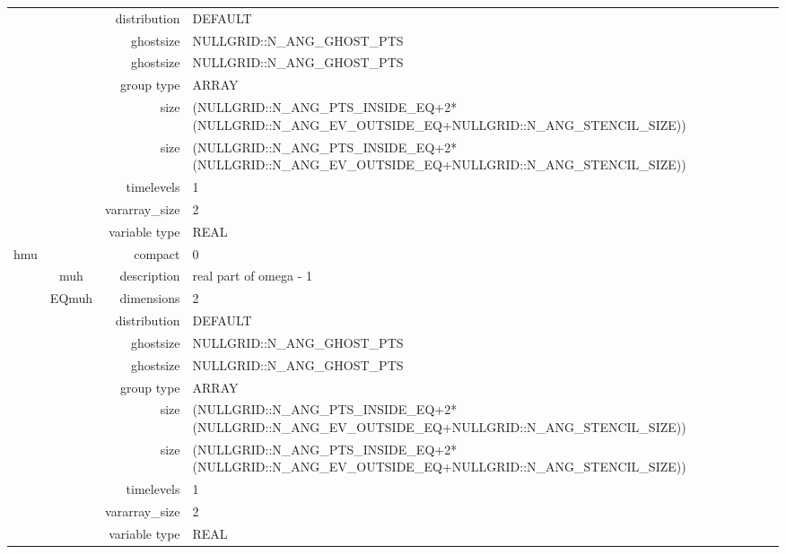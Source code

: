 \begin{tabular*}{150mm}{|c|c@{\extracolsep{\fill}}|rl|}
 &  & distribution & DEFAULT \\ 
 &  & ghostsize & NULLGRID::N\_ANG\_GHOST\_PTS \\ 
& ~ & ghostsize & NULLGRID::N\_ANG\_GHOST\_PTS \\ 
 &  & group type & ARRAY \\ 
 &  & size & (NULLGRID::N\_ANG\_PTS\_INSIDE\_EQ+2*(NULLGRID::N\_ANG\_EV\_OUTSIDE\_EQ+NULLGRID::N\_ANG\_STENCIL\_SIZE)) \\ 
& ~ & size & (NULLGRID::N\_ANG\_PTS\_INSIDE\_EQ+2*(NULLGRID::N\_ANG\_EV\_OUTSIDE\_EQ+NULLGRID::N\_ANG\_STENCIL\_SIZE)) \\ 
 &  & timelevels & 1 \\ 
 &  & vararray\_size & 2 \\ 
 &  & variable type & REAL \\ 
\hline 
hmu &  & compact & 0 \\ 
 & muh & description & real part of omega - 1 \\ 
 & EQmuh & dimensions & 2 \\ 
 &  & distribution & DEFAULT \\ 
 &  & ghostsize & NULLGRID::N\_ANG\_GHOST\_PTS \\ 
& ~ & ghostsize & NULLGRID::N\_ANG\_GHOST\_PTS \\ 
 &  & group type & ARRAY \\ 
 &  & size & (NULLGRID::N\_ANG\_PTS\_INSIDE\_EQ+2*(NULLGRID::N\_ANG\_EV\_OUTSIDE\_EQ+NULLGRID::N\_ANG\_STENCIL\_SIZE)) \\ 
& ~ & size & (NULLGRID::N\_ANG\_PTS\_INSIDE\_EQ+2*(NULLGRID::N\_ANG\_EV\_OUTSIDE\_EQ+NULLGRID::N\_ANG\_STENCIL\_SIZE)) \\ 
 &  & timelevels & 1 \\ 
 &  & vararray\_size & 2 \\ 
 &  & variable type & REAL \\ 
\hline 
\end{tabular*} 



\vspace{5mm}
\vspace{5mm}

